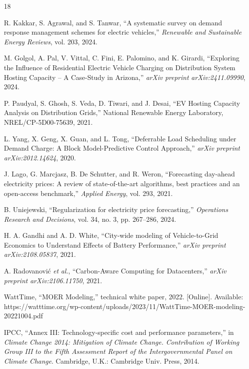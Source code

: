 \documentclass[journal]{IEEEtran}
\begin{document}
\begin{thebibliography}{18}

R. Kakkar, S. Agrawal, and S. Tanwar, ``A systematic survey on demand response management schemes for electric vehicles,'' \emph{Renewable and Sustainable Energy Reviews}, vol. 203, 2024.

M. Golgol, A. Pal, V. Vittal, C. Fini, E. Palomino, and K. Girardi, ``Exploring the Influence of Residential Electric Vehicle Charging on Distribution System Hosting Capacity -- A Case-Study in Arizona,'' \emph{arXiv preprint arXiv:2411.09990}, 2024.

P. Paudyal, S. Ghosh, S. Veda, D. Tiwari, and J. Desai, ``EV Hosting Capacity Analysis on Distribution Grids,'' National Renewable Energy Laboratory, NREL/CP-5D00-75639, 2021.

L. Yang, X. Geng, X. Guan, and L. Tong, ``Deferrable Load Scheduling under Demand Charge: A Block Model-Predictive Control Approach,'' \emph{arXiv preprint arXiv:2012.14624}, 2020.

J. Lago, G. Marcjasz, B. De Schutter, and R. Weron, ``Forecasting day-ahead electricity prices: A review of state-of-the-art algorithms, best practices and an open-access benchmark,'' \emph{Applied Energy}, vol. 293, 2021.

B. Uniejewski, ``Regularization for electricity price forecasting,'' \emph{Operations Research and Decisions}, vol. 34, no. 3, pp. 267--286, 2024.

H. A. Gandhi and A. D. White, ``City-wide modeling of Vehicle-to-Grid Economics to Understand Effects of Battery Performance,'' \emph{arXiv preprint arXiv:2108.05837}, 2021.

A. Radovanovi{\'c} \emph{et al.}, ``Carbon-Aware Computing for Datacenters,'' \emph{arXiv preprint arXiv:2106.11750}, 2021.

WattTime, ``MOER Modeling,'' technical white paper, 2022. [Online]. Available: https://watttime.org/wp-content/uploads/2023/11/WattTime-MOER-modeling-20221004.pdf

IPCC, ``Annex III: Technology-specific cost and performance parameters,'' in \emph{Climate Change 2014: Mitigation of Climate Change. Contribution of Working Group III to the Fifth Assessment Report of the Intergovernmental Panel on Climate Change}. Cambridge, U.K.: Cambridge Univ. Press, 2014.


\end{thebibliography}
\end{document}
